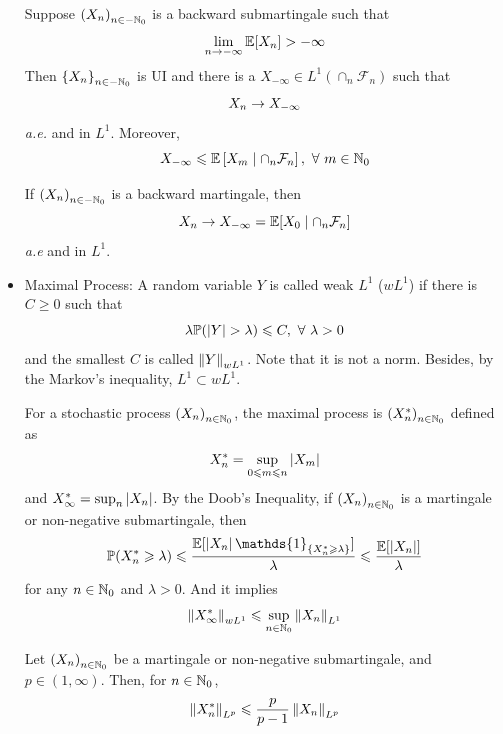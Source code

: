 \documentclass[a4paper,12pt]{article}
\begin{document}
\begin{itemize}
  \begin{thm}
    Suppose $\left(X_n\right)_{n\in -\mathbb{N}_0}$ is a backward submartingale such that
    \begin{equation*}
      \lim_{n \rightarrow -\infty}\mathbb{E}[X_n] > -\infty
    \end{equation*}
    Then $\left\{X_n\right\}_{n\in -\mathbb{N}_0}$ is UI and there is a $X_{-\infty} \in L^1(\cap_n\mathcal{F}_n)$ such that
    \begin{equation*}
      X_n \rightarrow X_{-\infty}
    \end{equation*}
    \emph{a.e.} and in $L^1$. Moreover,
    \begin{equation*}
      X_{-\infty} \leqslant \mathbb{E}\left[X_m \mid \cap_n\mathcal{F}_n\right],~\forall~m\in \mathbb{N}_0
    \end{equation*}
  \end{thm}

  \noindent If $\left(X_n\right)_{n\in -\mathbb{N}_0}$ is a backward martingale, then
  \begin{equation*}
    X_n \rightarrow X_{-\infty} = \mathbb{E}[X_0 \mid \cap_n\mathcal{F}_n]
  \end{equation*}
  \emph{a.e} and in $L^1$.

  \item Maximal Process:  A random variable $Y$ is called weak $L^1$ ($wL^1$) if there is $C\geqslant 0$ such that 
  \begin{equation*}
    \lambda\mathbb{P}(\left\lvert Y\right\lvert > \lambda) \leqslant C,~\forall~\lambda > 0
  \end{equation*}
  and the smallest $C$ is called $\left\lVert Y\right\lVert_{wL^1}$. Note that it is not a norm. Besides, by the Markov's inequality, $L^1 \subset wL^1$.

  \noindent For a stochastic process $\left(X_n\right)_{n\in \mathbb{N}_0}$, the maximal process is $\left(X_n^*\right)_{n\in \mathbb{N}_0}$ defined as
  \begin{equation*}
    X_n^* = \sup_{0\leqslant m \leqslant n}\left\lvert X_m\right\lvert
  \end{equation*}
  and $X_{\infty}^* = \sup_{n}\left\lvert X_n\right\lvert$. By the Doob's Inequality, if $\left(X_n\right)_{n\in \mathbb{N}_0}$ is a martingale or non-negative submartingale, then
  \begin{equation*}
    \Pb(X_n^* \geqslant \lambda) \leqslant \frac{\E[\abs{X_n}\mathds{1}_{\bb{X_n^* \geqslant \lambda}}]}{\lambda} \leqslant \frac{\E[\abs{X_n}]}{\lambda}
  \end{equation*} 
  for any $n \in \mathbb{N}_0$ and $\lambda > 0$. And it implies
  \begin{equation*}
    \left\lVert X_{\infty}^*\right\lVert_{wL^1} \leqslant \sup_{n \in \mathbb{N}_0}\left\lVert X_n\right\lVert_{L^1}
  \end{equation*}
  \begin{thm}
    Let $\left(X_n\right)_{n\in \mathbb{N}_0}$ be a martingale or non-negative submartingale, and $p \in (1,\infty)$. Then, for $n \in \mathbb{N}_0$,
    \begin{equation*}
      \left\lVert X_n^*\right\lVert_{L^p} \leqslant \frac{p}{p-1}\left\lVert X_n\right\lVert_{L^p}
    \end{equation*}
  \end{thm}


\end{itemize}
\end{document}
